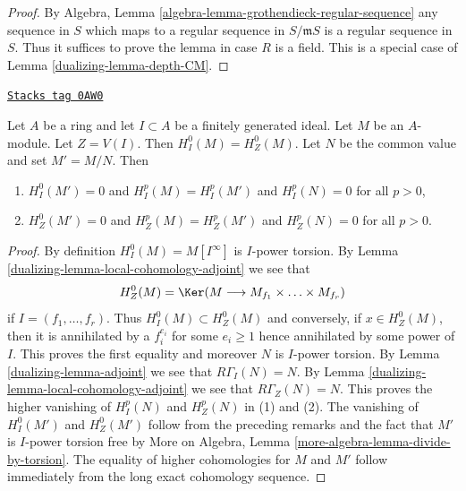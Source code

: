 \begin{proof}

By Algebra, Lemma \ref{algebra-lemma-grothendieck-regular-sequence}
any sequence in $S$ which maps to a regular sequence in $S/\mathfrak mS$
is a regular sequence in $S$. Thus it suffices to prove the lemma
in case $R$ is a field. This is a special case of Lemma \ref{dualizing-lemma-depth-CM}.
\end{proof}

\begin{lemma}
\label{dualizing-lemma-divide-by-torsion}
\href{https://stacks.math.columbia.edu/tag/0AW0}{\texttt{Stacks tag 0AW0}}

Let $A$ be a ring and let $I \subset A$ be a finitely generated ideal.
Let $M$ be an $A$-module. Let $Z = V(I)$.
Then $H^0_I(M) = H^0_Z(M)$. Let $N$ be the common value and
set $M' = M/N$. Then
\begin{enumerate}
\item $H^0_I(M') = 0$ and $H^p_I(M) = H^p_I(M')$ and $H^p_I(N) = 0$
for all $p > 0$,
\item $H^0_Z(M') = 0$ and $H^p_Z(M) = H^p_Z(M')$ and $H^p_Z(N) = 0$
for all $p > 0$.
\end{enumerate}
\end{lemma}

\begin{proof}

By definition $H^0_I(M) = M[I^\infty]$ is $I$-power torsion.
By Lemma \ref{dualizing-lemma-local-cohomology-adjoint} we see that
$$
H^0_Z(M) = \Ker(M \longrightarrow M_{f_1} \times \ldots \times M_{f_r})
$$
if $I = (f_1, \ldots, f_r)$. Thus $H^0_I(M) \subset H^0_Z(M)$ and
conversely, if $x \in H^0_Z(M)$, then it is annihilated by a $f_i^{e_i}$
for some $e_i \geq 1$ hence annihilated by some power of $I$.
This proves the first equality and moreover $N$ is $I$-power torsion.
By Lemma \ref{dualizing-lemma-adjoint} we see that $R\Gamma_I(N) = N$.
By Lemma \ref{dualizing-lemma-local-cohomology-adjoint} we see that $R\Gamma_Z(N) = N$.
This proves the higher vanishing of $H^p_I(N)$ and $H^p_Z(N)$ in (1) and (2).
The vanishing of $H^0_I(M')$ and $H^0_Z(M')$ follow from the preceding
remarks and the fact that $M'$ is $I$-power torsion free by
More on Algebra, Lemma \ref{more-algebra-lemma-divide-by-torsion}.
The equality of higher cohomologies for $M$ and $M'$ follow
immediately from the long exact cohomology sequence.
\end{proof}

